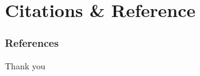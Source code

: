 \documentclass{beamer}
\begin{document}
\section{Citations \& Reference}



\begin{frame}[allowframebreaks]
\frametitle{References}
\nocite{
Widyantara2021,
Deswara2015,
Irmawan2018,
Prakoso2016,
Hartono2017,
Zakky2020}



\end{frame}


\begin{frame}
\Huge{\centerline{Thank you}}
\end{frame}

\end{document}
